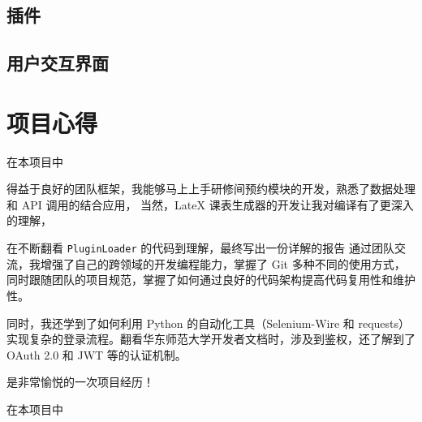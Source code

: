 \documentclass[14pt,a4paper,UTF8,twoside]{article}
\begin{document}
    \subsection{插件}\label{subsec:plugins}
    
    
    
    

    \subsection{用户交互界面}\label{subsec:gui}
    

    \section{项目心得}\label{sec:thoughts}

    \begin{Thought}[关卓谦]
        在本项目中
    \end{Thought}

    \begin{Thought}[张梓卫]
        得益于良好的团队框架，我能够马上上手研修间预约模块的开发，熟悉了数据处理和 API 调用的结合应用，
        当然，LateX 课表生成器的开发让我对编译有了更深入的理解，

        \vspace{0.3cm}

        在不断翻看 \verb`PluginLoader` 的代码到理解，最终写出一份详解的报告
        通过团队交流，我增强了自己的跨领域的开发编程能力，掌握了 Git 多种不同的使用方式，
        同时跟随团队的项目规范，掌握了如何通过良好的代码架构提高代码复用性和维护性。

        \vspace{0.3cm}

        同时，我还学到了如何利用 Python 的自动化工具（Selenium-Wire 和 requests）
        实现复杂的登录流程。翻看华东师范大学开发者文档时，涉及到鉴权，还了解到了 OAuth 2.0 和 JWT 等的认证机制。

        \vspace{0.3cm}

        是非常愉悦的一次项目经历！
    \end{Thought}

    \begin{Thought}[王文锦]
        在本项目中
    \end{Thought}
\end{document}

